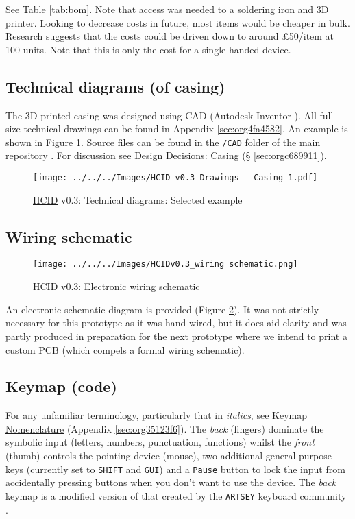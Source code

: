 \documentclass[logo,bsc,singlespacing,parskip]{infthesis}
\begin{document}
See Table \ref{tab:bom}.
Note that access was needed to a soldering iron and 3D printer.
Looking to decrease costs in future, most items would be cheaper in bulk.
Research suggests that the costs could be driven down to around £50/item at 100 units.
Note that this is only the cost for a single-handed device.
\subsection{Technical diagrams (of casing)}
\label{sec:org4545299}
The 3D printed casing was designed using CAD (Autodesk Inventor \autocite{InventorSoftwareGet}).
All full size technical drawings can be found in Appendix \ref{sec:org4fa4582}.
An example is shown in Figure \ref{fig:tech_draw_ex}.
Source files can be found in the \texttt{/CAD} folder of the main repository \autocite{sharpNazzacodeHCIDMy}.
For discussion see \hyperref[sec:orgc689911]{Design Decisions: Casing} (§ \ref{sec:orgc689911}).

\begin{figure}[h]
\centering
\texttt{[image: ../../../Images/HCID v0.3 Drawings - Casing 1.pdf]}
\caption{\label{fig:tech_draw_ex}\hyperref[orgc00eca5]{HCID} v0.3: Technical diagrams: Selected example}
\end{figure}
\subsection{Wiring schematic}
\label{sec:org662b8d9}
\begin{figure}[h]
\centering
\texttt{[image: ../../../Images/HCIDv0.3\_wiring schematic.png]}
\caption{\label{fig:wiring_schematic}\hyperref[orgc00eca5]{HCID} v0.3: Electronic wiring schematic}
\end{figure}

An electronic schematic diagram is provided (Figure \ref{fig:wiring_schematic}).
It was not strictly necessary for this prototype as it was hand-wired, but it does aid clarity and was partly produced in preparation for the next prototype where we intend to print a custom PCB (which compels a formal wiring schematic).
\subsection{Keymap (code)}
\label{sec:org2dfb6a8}
For any unfamiliar terminology, particularly that in \emph{italics}, see \hyperref[sec:org35123f6]{Keymap Nomenclature} (Appendix \ref{sec:org35123f6}).
The \emph{back} (fingers) dominate the symbolic input (letters, numbers, punctuation, functions) whilst the \emph{front} (thumb) controls the pointing device (mouse), two additional general-purpose keys (currently set to \texttt{SHIFT} and \texttt{GUI}) and a \texttt{Pause} button to lock the input from accidentally pressing buttons when you don't want to use the device.
The \emph{back} keymap is a modified version of that created by the \texttt{ARTSEY} keyboard community \autocite{ARTSEYEasyFast}.
\end{document}
